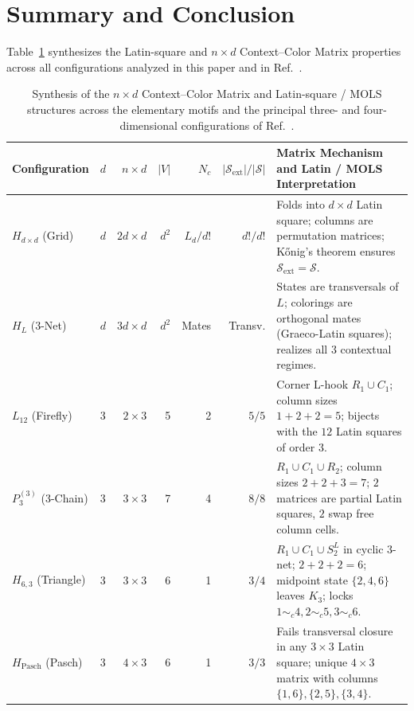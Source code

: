 \documentclass[aps,pra,reprint,superscriptaddress,longbibliography,nofootinbib,floatfix,10pt]{revtex4-2}
\theoremstyle{definition}\newtheorem{definition}[theorem]{Definition}
\theoremstyle{remark}\newtheorem{remark}[theorem]{Remark}
\newcommand{\Sc}{\mathcal S}\newcommand{\Cc}{\mathcal C}
\begin{document}
\section{Summary and Conclusion}\label{sec:conclusion}

Table~\ref{tab:master-matrix-synthesis} synthesizes the Latin-square and $n\times d$ Context--Color Matrix properties across all configurations analyzed in this paper and in Ref.~\cite{svozil-2025-color}.

\begin{table}[t]
\centering\footnotesize\setlength{\tabcolsep}{2.5pt}
\caption{Synthesis of the $n\times d$ Context--Color Matrix and Latin-square / MOLS structures across the elementary motifs and the principal three- and four-dimensional configurations of Ref.~\cite{svozil-2025-color}.}\label{tab:master-matrix-synthesis}
\begin{tabular}{llrrrrp{}}\toprule
Configuration & $d$ & $n\times d$ & $|V|$ & $N_c$ & $|\Sc_{\mathrm{ext}}|/|\Sc|$ & Matrix Mechanism and Latin / MOLS Interpretation\\\midrule
$H_{d\times d}$ (Grid) & $d$ & $2d\times d$ & $d^2$ & $L_d/d!$ & $d!/d!$ & Folds into $d\times d$ Latin square; columns are permutation matrices; K\H{o}nig's theorem ensures $\Sc_{\mathrm{ext}}=\Sc$.\\
$H_L$ ($3$-Net) & $d$ & $3d\times d$ & $d^2$ & Mates & Transv. & States are transversals of $L$; colorings are orthogonal mates (Graeco-Latin squares); realizes all $3$ contextual regimes.\\
$L_{12}$ (Firefly) & 3 & $2\times 3$ & 5 & 2 & $5/5$ & Corner L-hook $R_1\cup C_1$; column sizes $1+2+2=5$; bijects with the $12$ Latin squares of order $3$.\\
$P_3^{(3)}$ (3-Chain) & 3 & $3\times 3$ & 7 & 4 & $8/8$ & $R_1\cup C_1\cup R_2$; column sizes $2+2+3=7$; $2$ matrices are partial Latin squares, $2$ swap free column cells.\\
$H_{6,3}$ (Triangle) & 3 & $3\times 3$ & 6 & 1 & $3/4$ & $R_1\cup C_1\cup S_2^L$ in cyclic $3$-net; $2+2+2=6$; midpoint state $\{2,4,6\}$ leaves $K_3$; locks $1\sim_c 4,2\sim_c 5,3\sim_c 6$.\\
$H_{\mathrm{Pasch}}$ (Pasch) & 3 & $4\times 3$ & 6 & 1 & $3/3$ & Fails transversal closure in any $3\times 3$ Latin square; unique $4\times 3$ matrix with columns $\{1,6\},\{2,5\},\{3,4\}$.\\

\end{tabular}
\end{table}
\end{document}
